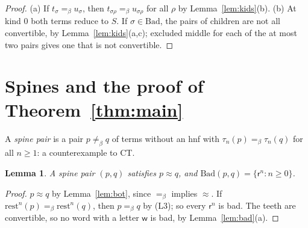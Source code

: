 \documentclass[11pt]{amsart}
\newtheorem{lemma}[theorem]{Lemma}
\theoremstyle{definition}
\newcommand{\conv}{=_\beta}
\newcommand{\nconv}{\neq_\beta}
\newcommand{\rest}{\mathrm{rest}}
\newcommand{\Bad}{\mathrm{Bad}}
\newcommand{\lr}{\mathsf r}
\newcommand{\lw}{\mathsf w}
\begin{document}
\begin{proof}
(a) If $t_\sigma\conv u_\sigma$, then $t_{\sigma\rho}\conv u_{\sigma\rho}$ for all $\rho$ by
Lemma~\ref{lem:kids}(b). (b) At kind $0$ both terms reduce to $S$. If $\sigma\in\Bad$, the pairs of
children are not all convertible, by Lemma~\ref{lem:kids}(a,c); excluded middle for each of the at
most two pairs gives one that is not convertible.
\end{proof}

\section{Spines and the proof of Theorem~\ref{thm:main}}\label{sec:proof}

A \emph{spine pair} is a pair $p\nconv q$ of terms without an hnf with $\tau_n(p)\conv\tau_n(q)$ for all
$n\ge1$: a counterexample to CT.

\begin{lemma}\label{lem:spine}
A spine pair $(p,q)$ satisfies $p\approx q$, and $\Bad(p,q)=\{\lr^n:n\ge0\}$.
\end{lemma}

\begin{proof}
$p\approx q$ by Lemma~\ref{lem:bot}, since $\conv$ implies $\approx$. If $\rest^n(p)\conv\rest^n(q)$,
then $p\conv q$ by (L3); so every $\lr^n$ is bad. The teeth are convertible, so no word with a letter
$\lw$ is bad, by Lemma~\ref{lem:bad}(a).
\end{proof}
\end{document}
